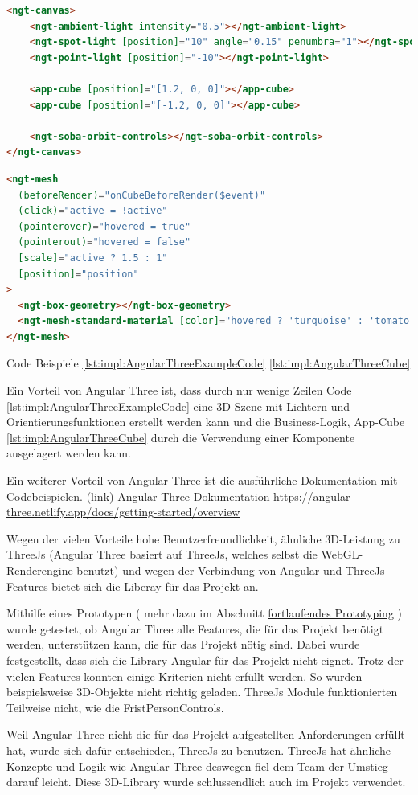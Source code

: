 \begin{lstlisting}[language=html,caption=Angular Three - Komponentenbasiertes 3D Scenen in HTML,label=lst:impl:AngularThreeExampleCode]
<ngt-canvas>
    <ngt-ambient-light intensity="0.5"></ngt-ambient-light>
    <ngt-spot-light [position]="10" angle="0.15" penumbra="1"></ngt-spot-light>
    <ngt-point-light [position]="-10"></ngt-point-light>
  
    <app-cube [position]="[1.2, 0, 0]"></app-cube>
    <app-cube [position]="[-1.2, 0, 0]"></app-cube>
  
    <ngt-soba-orbit-controls></ngt-soba-orbit-controls>
</ngt-canvas>
\end{lstlisting}

\begin{lstlisting}[language=html,caption=Angular Three - App Cube,label=lst:impl:AngularThreeCube]
<ngt-mesh
  (beforeRender)="onCubeBeforeRender($event)"
  (click)="active = !active"
  (pointerover)="hovered = true"
  (pointerout)="hovered = false"
  [scale]="active ? 1.5 : 1"
  [position]="position"
>
  <ngt-box-geometry></ngt-box-geometry>
  <ngt-mesh-standard-material [color]="hovered ? 'turquoise' : 'tomato'"></ngt-mesh-standard-material>
</ngt-mesh>
\end{lstlisting}

Code Beispiele \ref{lst:impl:AngularThreeExampleCode} \ref{lst:impl:AngularThreeCube} \cite{AngularThreeDocumentationFirstScene}

Ein Vorteil von Angular Three ist, dass durch nur wenige Zeilen Code \ref{lst:impl:AngularThreeExampleCode} eine 3D-Szene mit Lichtern und Orientierungsfunktionen erstellt werden kann und die Business-Logik, App-Cube \ref{lst:impl:AngularThreeCube} durch die Verwendung einer Komponente ausgelagert werden kann.

Ein weiterer Vorteil von Angular Three ist die ausführliche Dokumentation mit Codebeispielen. \href{https://angular-three.netlify.app/docs/getting-started/overview}{(link) Angular Three Dokumentation https://angular-three.netlify.app/docs/getting-started/overview}

Wegen der vielen Vorteile hohe Benutzerfreundlichkeit, ähnliche 3D-Leistung zu ThreeJs (Angular Three basiert auf ThreeJs, welches selbst die WebGL-Renderengine benutzt) und wegen der Verbindung von Angular und ThreeJs Features bietet sich die Liberay für das Projekt an.

Mithilfe eines Prototypen ( mehr dazu im Abschnitt \hyperref[ch::ongoing-prototyping]{fortlaufendes Prototyping} ) wurde getestet, ob Angular Three alle Features, die für das Projekt benötigt werden, unterstützen kann, die für das Projekt nötig sind. Dabei wurde festgestellt, dass sich die Library Angular für das Projekt nicht eignet. Trotz der vielen Features konnten einige Kriterien nicht erfüllt werden. So wurden beispielsweise 3D-Objekte nicht richtig geladen. ThreeJs Module funktionierten Teilweise nicht, wie die FristPersonControls. 

Weil Angular Three nicht die für das Projekt aufgestellten Anforderungen erfüllt hat, wurde sich dafür entschieden, ThreeJs zu benutzen. ThreeJs hat ähnliche Konzepte und Logik wie Angular Three deswegen fiel dem Team der Umstieg darauf leicht. Diese 3D-Library wurde schlussendlich auch im Projekt verwendet.